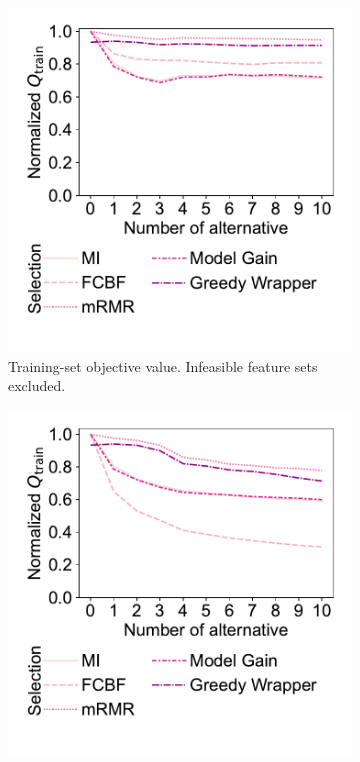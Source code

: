 \documentclass{article}
\theoremstyle{definition}
\begin{document}
\begin{figure}[htbp]
	\centering
	\begin{subfigure}[t]{0.48\textwidth}
		\centering
		\includegraphics[width=\textwidth, trim=20 40 15 15, clip]{plots/afs-impact-num-alternatives-fs-method-train-objective-max.pdf}
		\caption{
			Training-set objective value.
			Infeasible feature sets excluded.
		}
		\label{fig:afs:impact-num-alternatives-fs-method-train-objective-max}
	\end{subfigure}
	\hfill
	\begin{subfigure}[t]{0.48\textwidth}
		\centering
		\includegraphics[width=\textwidth, trim=20 40 15 15, clip]{plots/afs-impact-num-alternatives-fs-method-train-objective-max-fillna.pdf}

\end{subfigure}
\end{figure}
\end{document}
